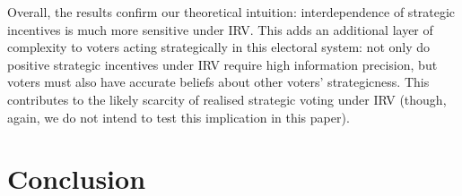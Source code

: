 \documentclass[12pt, letter]{article}
\begin{document}
Overall, the results confirm our theoretical intuition: interdependence of strategic incentives is much more sensitive under IRV. This adds an additional layer of complexity to voters acting strategically in this electoral system: not only do positive strategic incentives under IRV require high information precision, but voters must also have accurate beliefs about other voters' strategicness. This contributes to the likely scarcity of realised strategic voting under IRV (though, again, we do not intend to test this implication in this paper).

\section{Conclusion}
\end{document}
